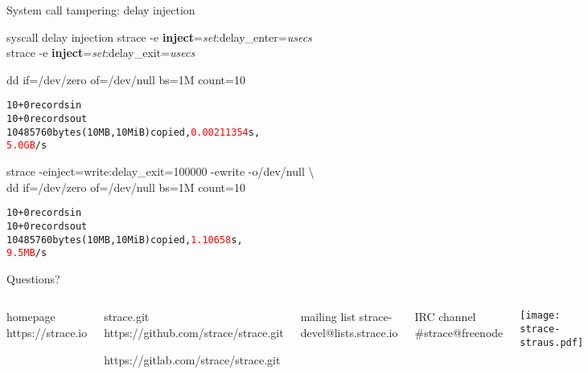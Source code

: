 \documentclass[unicode]{beamer}
\begin{document}
\begin{frame}[fragile]{System call tampering: delay injection}
\begin{block}{\large syscall delay injection}
strace -e \textbf{inject}=\textit{set}:delay\_enter=\textit{usecs} \\
strace -e \textbf{inject}=\textit{set}:delay\_exit=\textit{usecs}
\end{block}

\begin{block}{dd if=/dev/zero of=/dev/null bs=1M count=10}
\begin{alltt}
10+0 records in
10+0 records out
10485760 bytes (10 MB, 10 MiB) copied, \textcolor{red}{0.00211354} s,
\textcolor{red}{5.0 GB}/s
\end{alltt}
\end{block}

\begin{block}{strace -einject=write:delay\_exit=100000 -ewrite -o/dev/null \textbackslash\\
dd if=/dev/zero of=/dev/null bs=1M count=10}
\begin{alltt}
10+0 records in
10+0 records out
10485760 bytes (10 MB, 10 MiB) copied, \textcolor{red}{1.10658} s,
\textcolor{red}{9.5 MB}/s
\end{alltt}
\end{block}
\end{frame}

{
\begin{frame}{Questions?}
	\begin{columns}
		\column{7cm}
\begin{block}{\large homepage}
	https://strace.io
\end{block}
\begin{block}{\large strace.git}
	https://github.com/strace/strace.git

	https://gitlab.com/strace/strace.git
\end{block}
\begin{block}{\large mailing list}
	strace-devel@lists.strace.io
\end{block}
\begin{block}{\large IRC channel}
	\#strace@freenode
\end{block}
		\column{3cm}
			\centerline{\texttt{[image: strace-straus.pdf]}}
	\end{columns}
\end{frame}
}
\end{document}
